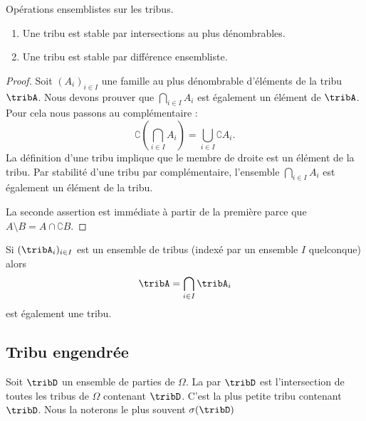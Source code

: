 \begin{lemma}   \label{LemBWNlKfA}
	Opérations ensemblistes sur les tribus.
	\begin{enumerate}
		\item       \label{ITEMooTDXNooFszBzi}
		      Une tribu est stable par intersections au plus dénombrables.
		\item       \label{ItemXQVLooFGBQNj}
		      Une tribu est stable par différence ensembliste.
	\end{enumerate}
\end{lemma}

\begin{proof}
	Soit \( (A_i)_{i\in I}\) une famille au plus dénombrable d'éléments de la tribu \( \tribA\). Nous devons prouver que \( \bigcap_{i\in I}A_i\) est également un élément de \( \tribA\). Pour cela nous passons au complémentaire :
	\begin{equation}
		\complement\left( \bigcap_{i\in I}A_i \right)=\bigcup_{i\in I}\complement A_i.
	\end{equation}
	La définition d'une tribu implique que le membre de droite est un élément de la tribu. Par stabilité d'une tribu par complémentaire, l'ensemble \( \bigcap_{i\in I}A_i\) est également un élément de la tribu.

	La seconde assertion est immédiate à partir de la première parce que \( A\setminus B=A\cap \complement B\).
\end{proof}

Si \( (\tribA_i)_{i\in I}\) est un ensemble de tribus (indexé par un ensemble \( I\) quelconque) alors
\begin{equation}
	\tribA=\bigcap_{i\in I}\tribA_i
\end{equation}
est également une tribu.

\subsection{Tribu engendrée}

\begin{definition}      \label{DEFooJSAKooSDnGzt}
	Soit \( \tribD\) un ensemble de parties de \( \Omega\). La  par \( \tribD\) est l'intersection de toutes les tribus de \( \Omega\) contenant \( \tribD\). C'est la plus petite tribu contenant \( \tribD\). Nous la noterons le plus souvent \( \sigma(\tribD)\)
\end{definition}



